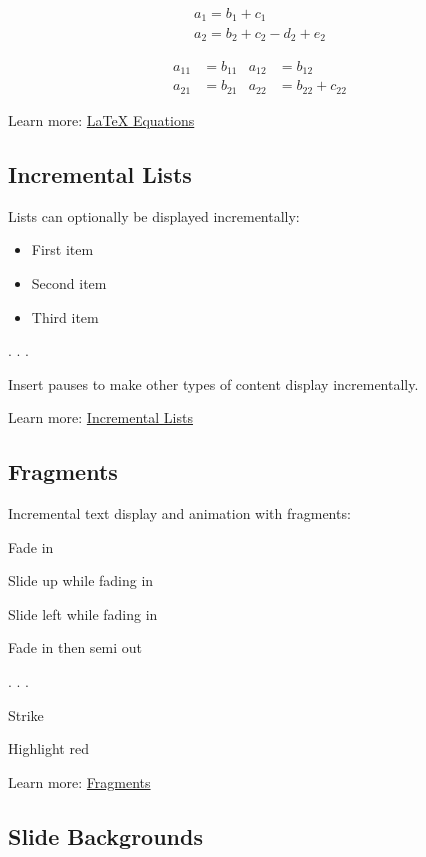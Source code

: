 \documentclass[
  letterpaper,
  DIV=11,
  numbers=noendperiod]{scrartcl}
\providecommand{\tightlist}{%
  \setlength{\itemsep}{0pt}\setlength{\parskip}{0pt}}\usepackage{longtable,booktabs,array}
\begin{document}
\begin{gather*}
a_1=b_1+c_1\\
a_2=b_2+c_2-d_2+e_2
\end{gather*}

\begin{align}
a_{11}& =b_{11}&
  a_{12}& =b_{12}\\
a_{21}& =b_{21}&
  a_{22}& =b_{22}+c_{22}
\end{align}

Learn more:
\href{https://quarto.org/docs/authoring/markdown-basics.html\#equations}{LaTeX
Equations}

\hypertarget{incremental-lists}{%
\subsection{Incremental Lists}\label{incremental-lists}}

Lists can optionally be displayed incrementally:

\begin{itemize}
\tightlist
\item
  First item
\item
  Second item
\item
  Third item
\end{itemize}

. . .

Insert pauses to make other types of content display incrementally.

Learn more:
\href{https://quarto.org/docs/presentations/revealjs/\#incremental-lists}{Incremental
Lists}

\hypertarget{fragments}{%
\subsection{Fragments}\label{fragments}}

Incremental text display and animation with fragments:

Fade in

Slide up while fading in

Slide left while fading in

Fade in then semi out

. . .

Strike

Highlight red

Learn more:
\href{https://quarto.org/docs/presentations/revealjs/advanced.html\#fragments}{Fragments}

\hypertarget{slide-backgrounds}{%
\subsection{Slide Backgrounds}\label{slide-backgrounds}}
\end{document}

